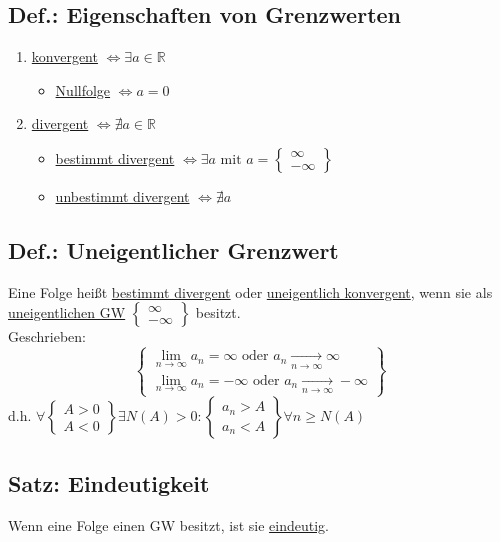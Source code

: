 \documentclass[a4paper,11pt]{article}
\begin{document}
\subsection{Def.: Eigenschaften von Grenzwerten}
\begin{enumerate}[label={\alph*)}]
	\item \underline{konvergent} $\Leftrightarrow\exists a\in\mathbb{R}$
		\begin{itemize}
			\item \underline{Nullfolge} $\Leftrightarrow a = 0$
		\end{itemize}
	\item \underline{divergent} $\Leftrightarrow\nexists a\in\mathbb{R}$
		\begin{itemize}
			\item \underline{bestimmt divergent} $\Leftrightarrow\exists a\text{ mit }a=\begin{Bmatrix}\infty\\-\infty\end{Bmatrix}$
			\item \underline{unbestimmt divergent} $\Leftrightarrow\nexists a$
		\end{itemize}
\end{enumerate}
\subsection{Def.: Uneigentlicher Grenzwert}
	Eine Folge heißt \underline{bestimmt divergent} oder \underline{uneigentlich konvergent}, wenn sie als \underline{uneigentlichen GW}
		$\begin{Bmatrix}
			\infty\\
			-\infty
		\end{Bmatrix}$ besitzt.\\
		Geschrieben:
		\[\begin{Bmatrix}
			\underset{n\rightarrow\infty}{\lim}a_n=\infty\text{ oder }a_n\underset{n\to\infty}{\to}\infty\\
			\underset{n\rightarrow\infty}{\lim}a_n=-\infty\text{ oder }a_n\underset{n\to\infty}{\rightarrow}-\infty
		\end{Bmatrix}\]
		d.h. $\forall\begin{Bmatrix}A>0\\A<0\end{Bmatrix}\exists N(A)>0: \begin{Bmatrix}a_n>A\\a_n<A\end{Bmatrix}\forall n\geq N(A)$
\subsection{Satz: Eindeutigkeit}
Wenn eine Folge einen GW besitzt, ist sie \underline{eindeutig}.
\end{document}
